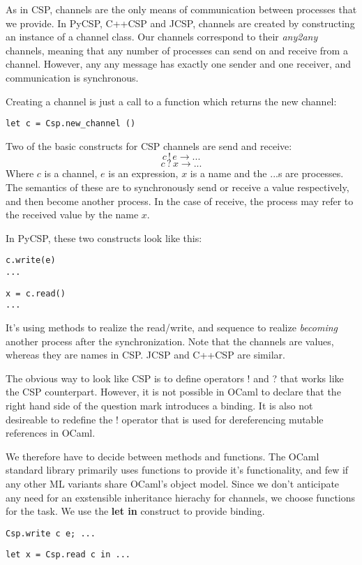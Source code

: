 \documentclass[a4paper,12pt]{article}
\begin{document}
As in CSP, channels are the only means of communication between processes that we provide.
In PyCSP, C++CSP and JCSP, channels are created by constructing an instance of a channel
class. Our channels correspond to their \emph{any2any} channels, meaning that any number
of processes can send on and receive from a channel. However, any any message has exactly 
one sender and one receiver, and communication is synchronous.

Creating a channel is just a call to a function which returns the new channel:
\begin{verbatim}
let c = Csp.new_channel ()
\end{verbatim}

Two of the basic constructs for CSP channels are send and receive:
\[c\,!\,e \to ...\]
\[c\,?\,x \to ...\]
Where $c$ is a channel, $e$ is an expression, $x$ is a name and the $...$s are processes. 
The semantics of these are to synchronously send or receive a value respectively, and
then become another process. In the case of receive, the process may refer to the
received value by the name $x$.

In PyCSP, these two constructs look like this:
\begin{verbatim}
c.write(e)
...
\end{verbatim}
\begin{verbatim}
x = c.read()
...
\end{verbatim}
It's using methods to realize the read/write, and sequence to realize \emph{becoming}
another process after the synchronization. Note that the channels are values, whereas
they are names in CSP. JCSP and C++CSP are similar.

The obvious way to look like CSP is to define operators ! and ? that works like the
CSP counterpart. However, it is not possible in OCaml to declare that the right hand 
side of the question mark introduces a binding. It is also not desireable to redefine
the ! operator that is used for dereferencing mutable references in OCaml.

We therefore have to decide between methods and functions. The OCaml standard library
primarily uses functions to provide it's functionality, and few if any other ML 
variants share OCaml's object model. Since we don't anticipate any need for an
exstensible inheritance hierachy for channels, we choose functions for the task.
We use the \textbf{let in} construct to provide binding.

\begin{verbatim}
Csp.write c e; ...
\end{verbatim}
\begin{verbatim}
let x = Csp.read c in ...
\end{verbatim}
\end{document}
